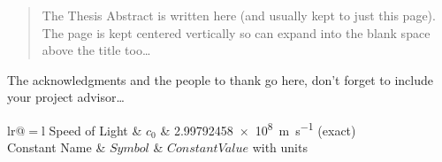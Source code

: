 \documentclass[
	12pt, %
	english, %
	onehalfspacing, %
	liststotoc, %
	toctotoc, %
	parskip, %
	headsepline, %
]{MastersDoctoralThesis} %
\begin{document}

\begin{abstract}
	\addchaptertocentry{\abstractname} %
	The Thesis Abstract is written here (and usually kept to just this page). The page is kept centered vertically so can expand into the blank space above the title too\ldots
\end{abstract}


\begin{acknowledgements}
	\addchaptertocentry{\acknowledgementname} %
	The acknowledgments and the people to thank go here, don't forget to include your project advisor\ldots
\end{acknowledgements}


\tableofcontents %
\listoffigures %
\listoftables %
\listofalgorithms %



\begin{constants}{lr@{${}={}$}l} %
	Speed of Light & $c_{0}$ & \SI{2.99792458e8}{\meter\per\second} (exact)\\
	Constant Name & $Symbol$ & $Constant Value$ with units\\
\end{constants}
\end{document}
